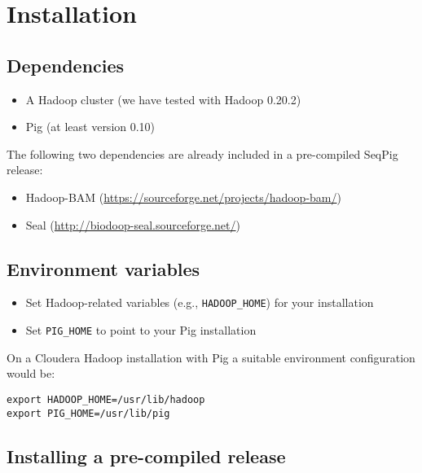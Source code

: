 
\section{Installation}



\subsection{Dependencies}

\begin{itemize}
	\item A Hadoop cluster (we have tested with Hadoop 0.20.2)
	\item Pig (at least version 0.10)
\end{itemize}
%
The following two dependencies are already included in a pre-compiled SeqPig release:
\begin{itemize}
\item Hadoop-BAM (\url{https://sourceforge.net/projects/hadoop-bam/})
\item Seal (\url{http://biodoop-seal.sourceforge.net/})
\end{itemize}

\subsection{Environment variables}
\label{sect:install_env}
\begin{itemize}
\item Set Hadoop-related variables (e.g., {\tt HADOOP\_HOME}) for your
	installation
\item Set {\tt PIG\_HOME} to point to your Pig installation
\end{itemize}

On a Cloudera Hadoop installation with Pig a suitable environment configuration would be:
\begin{lstlisting} 
export HADOOP_HOME=/usr/lib/hadoop
export PIG_HOME=/usr/lib/pig
\end{lstlisting}

\subsection{Installing a pre-compiled release}

